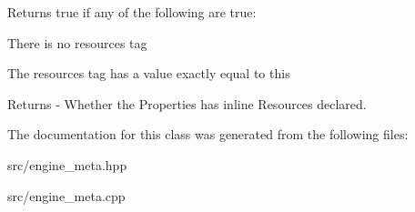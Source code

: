 Returns true if any of the following are true\+:
\begin{DoxyItemize}
\item There is no \textquotesingle{}resources\textquotesingle{} tag
\item The \textquotesingle{}resources\textquotesingle{} tag has a value exactly equal to \textquotesingle{}this\textquotesingle{} \begin{DoxyReturn}{Returns}
-\/ Whether the Properties has inline Resources declared. 
\end{DoxyReturn}

\end{DoxyItemize}

The documentation for this class was generated from the following files\+:\begin{DoxyCompactItemize}
\item 
src/engine\+\_\+meta.\+hpp\item 
src/engine\+\_\+meta.\+cpp\end{DoxyCompactItemize}
